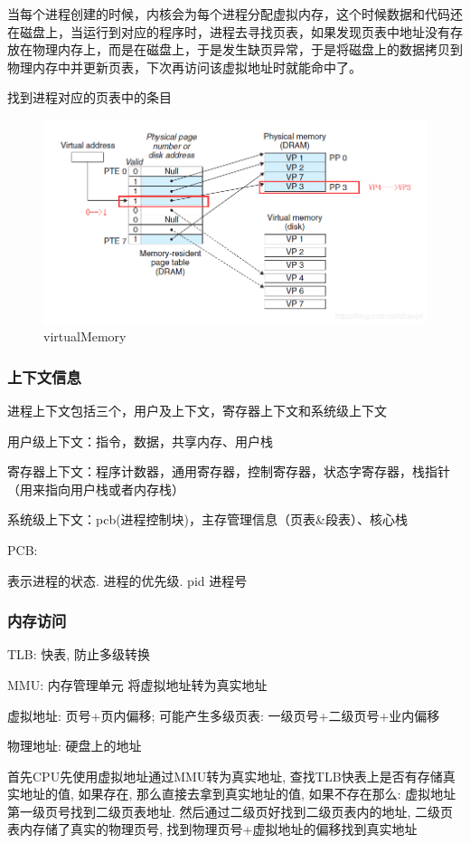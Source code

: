 当每个进程创建的时候，内核会为每个进程分配虚拟内存，这个时候数据和代码还在磁盘上，当运行到对应的程序时，进程去寻找页表，如果发现页表中地址没有存放在物理内存上，而是在磁盘上，于是发生缺页异常，于是将磁盘上的数据拷贝到物理内存中并更新页表，下次再访问该虚拟地址时就能命中了。

找到进程对应的页表中的条目

\begin{figure}
	\centering
	\includegraphics[width=0.7\linewidth]{figures/virtualMemory.png}
	\caption{virtualMemory}
	\label{fig:virtualMemory}
\end{figure}


\subsubsection{上下文信息}
进程上下文包括三个，用户及上下文，寄存器上下文和系统级上下文

用户级上下文：指令，数据，共享内存、用户栈

寄存器上下文：程序计数器，通用寄存器，控制寄存器，状态字寄存器，栈指针（用来指向用户栈或者内存栈）

系统级上下文：pcb(进程控制块)，主存管理信息（页表\&段表）、核心栈

PCB:

表示进程的状态. 进程的优先级. pid 进程号

\subsubsection{内存访问}
TLB: 快表, 防止多级转换

MMU: 内存管理单元 将虚拟地址转为真实地址

虚拟地址: 页号+页内偏移; 可能产生多级页表: 一级页号+二级页号+业内偏移



物理地址: 硬盘上的地址


首先CPU先使用虚拟地址通过MMU转为真实地址, 查找TLB快表上是否有存储真实地址的值, 如果存在, 那么直接去拿到真实地址的值, 如果不存在那么: 虚拟地址第一级页号找到二级页表地址. 然后通过二级页好找到二级页表内的地址, 二级页表内存储了真实的物理页号, 找到物理页号+虚拟地址的偏移找到真实地址

